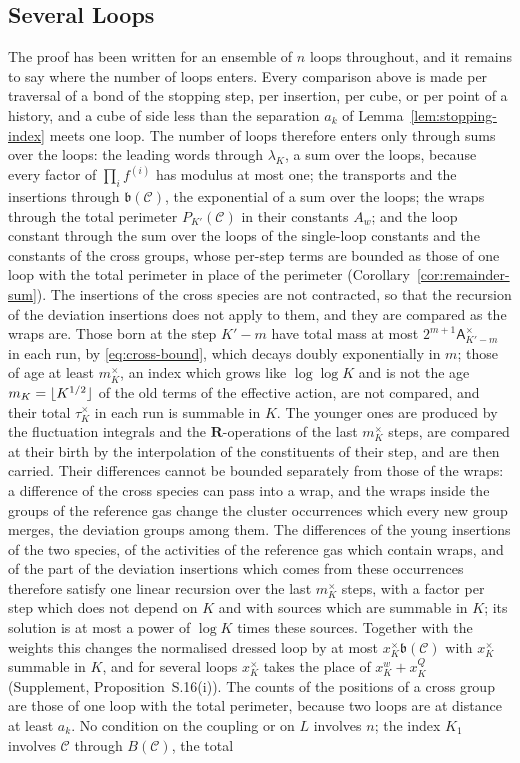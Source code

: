 \documentclass[11pt]{preprint}
\DeclarePairedDelimiter{\floor}{\lfloor}{\rfloor}
\numberwithin{equation}{section}
\theoremstyle{definition}
\theoremstyle{remark}
\theoremstyle{plain}
\begin{document}
\subsection{Several Loops}\label{sec:several-loops-cauchy}

The proof has been written for an ensemble of $n$ loops throughout, and it remains to say where the number of loops enters. Every comparison above is made per traversal of a bond of the stopping step, per insertion, per cube, or per point of a history, and a cube of side less than the separation $a_k$ of Lemma~\ref{lem:stopping-index} meets one loop. The number of loops therefore enters only through sums over the loops: the leading words through $\lambda_K$, a sum over the loops, because every factor of $\prod_if^{(i)}$ has modulus at most one; the transports and the insertions through $\mathfrak b(\mathcal C)$, the exponential of a sum over the loops; the wraps through the total perimeter $P_{K'}(\mathcal C)$ in their constants $A_w$; and the loop constant through the sum over the loops of the single-loop constants and the constants of the cross groups, whose per-step terms are bounded as those of one loop with the total perimeter in place of the perimeter (Corollary~\ref{cor:remainder-sum}). The insertions of the cross species are not contracted, so that the recursion of the deviation insertions does not apply to them, and they are compared as the wraps are. Those born at the step $K' - m$ have total mass at most $2^{m+1}\mathsf A^\times_{K'-m}$ in each run, by \eqref{eq:cross-bound}, which decays doubly exponentially in $m$; those of age at least $m^\times_K$, an index which grows like $\log\log K$ and is not the age $m_K = \floor{K^{1/2}}$ of the old terms of the effective action, are not compared, and their total $\tau^\times_K$ in each run is summable in $K$. The younger ones are produced by the fluctuation integrals and the $\mathbf R$-operations of the last $m^\times_K$ steps, are compared at their birth by the interpolation of the constituents of their step, and are then carried. Their differences cannot be bounded separately from those of the wraps: a difference of the cross species can pass into a wrap, and the wraps inside the groups of the reference gas change the cluster occurrences which every new group merges, the deviation groups among them. The differences of the young insertions of the two species, of the activities of the reference gas which contain wraps, and of the part of the deviation insertions which comes from these occurrences therefore satisfy one linear recursion over the last $m^\times_K$ steps, with a factor per step which does not depend on $K$ and with sources which are summable in $K$; its solution is at most a power of $\log K$ times these sources. Together with the weights this changes the normalised dressed loop by at most $x^\times_K\mathfrak b(\mathcal C)$ with $x^\times_K$ summable in $K$, and for several loops $x^\times_K$ takes the place of $x^w_K + x^Q_K$ (Supplement, Proposition~S.16(i)). The counts of the positions of a cross group are those of one loop with the total perimeter, because two loops are at distance at least $a_k$. No condition on the coupling or on $L$ involves $n$; the index $K_1$ involves $\mathcal C$ through $B(\mathcal C)$, the total 
\end{document}
